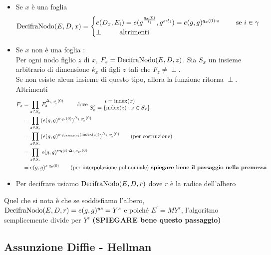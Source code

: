 \begin{itemize}
\begin{description}
\begin{itemize}
\item Se $x$ è una foglia
\[ \operatorname{DecifraNodo}(E,D,x) = \begin{cases}
e(D_x,E_i) = e(g^{\frac{q_x(0)}{t_i}},g^{s\cdot t_i}) = e(g,g)^{q_x(0) \cdot s} \qquad \text{ se } i \in \gamma \\
\perp \qquad \text{ altrimenti}  
\end{cases} \]
\item Se $x$ non è una foglia :\\
Per ogni nodo figlio $z$ di $x$, $F_z = \operatorname{DecifraNodo}(E,D,z)$. Sia $S_x$ un insieme arbitrario di dimensione $k_x$ di figli $z$ tali che $F_z \neq \perp$.\\
Se non esiste alcun insieme di questo tipo, allora la funzione ritorna $\perp$. Altrimenti
\begin{align*}
F_x &= \prod_{z \in S_x} F_z^{\Delta_{i,S_x^\prime}(0)} \qquad \text{ dove }
\begin{matrix}
i = \operatorname{index}(x)\\
S^\prime_x = \{ \operatorname{index}(z) : z \in S_x \}
\end{matrix}\\
&= \prod_{z \in S_x} (e(g,g)^{s \cdot q_z(0)})^{\Delta_{i,S_x^\prime}(0)}\\
&= \prod_{z \in S_x} (e(g,g)^{s \cdot q_{\operatorname{parent}(z)}(\operatorname{index}(z))})^{\Delta_{i,S_x^\prime}(0)} \qquad \text{(per costruzione)}\\
&= \prod_{z \in S_x} e(g,g)^{s \cdot q(i) \cdot \Delta_{i,S_x\prime}(0)}\\
&= e(g,g)^{s \cdot q_x(0)} \qquad \text{(per interpolazione polinomiale)\textbf{ spiegare bene il passaggio nella premessa}}
\end{align*}
\item Per decifrare usiamo $\operatorname{DecifraNodo} (E,D,r)$ dove $r$ è la radice dell'albero
\end{itemize}
Quel che si nota è che se soddisfiamo l'albero, $\operatorname{DecifraNodo} (E,D,r) = e(g,g)^{ys} = Y^s$ e poiché $E^\prime = MY^s$, l'algoritmo semplicemente divide per $Y^s$ \textbf{(SPIEGARE bene questo passaggio)}
\end{description}
\end{itemize}



\subsection{Assunzione Diffie - Hellman}

